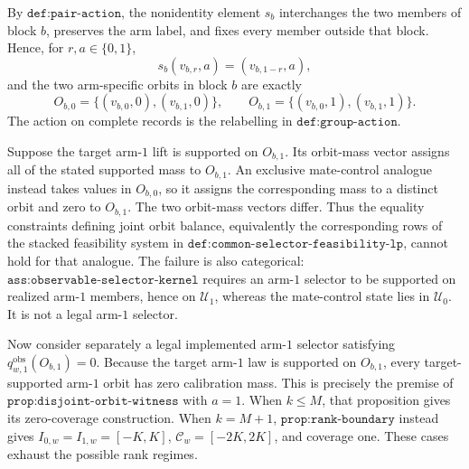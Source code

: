 By \(\texttt{def:pair-action}\), the nonidentity element \(s_b\) interchanges the two members of block \(b\), preserves the arm label, and fixes every member outside that block. Hence, for \(r,a\in\{0,1\}\),
\[s_b(v_{b,r},a)=(v_{b,1-r},a),\]
and the two arm-specific orbits in block \(b\) are exactly
\[O_{b,0}=\{(v_{b,0},0),(v_{b,1},0)\},\qquad O_{b,1}=\{(v_{b,0},1),(v_{b,1},1)\}.\]
The action on complete records is the relabelling in \(\texttt{def:group-action}\).

Suppose the target arm-\(1\) lift is supported on \(O_{b,1}\). Its orbit-mass vector assigns all of the stated supported mass to \(O_{b,1}\). An exclusive mate-control analogue instead takes values in \(O_{b,0}\), so it assigns the corresponding mass to a distinct orbit and zero to \(O_{b,1}\). The two orbit-mass vectors differ. Thus the equality constraints defining joint orbit balance, equivalently the corresponding rows of the stacked feasibility system in \(\texttt{def:common-selector-feasibility-lp}\), cannot hold for that analogue. The failure is also categorical: \(\texttt{ass:observable-selector-kernel}\) requires an arm-\(1\) selector to be supported on realized arm-\(1\) members, hence on \(\mathcal U_1\), whereas the mate-control state lies in \(\mathcal U_0\). It is not a legal arm-\(1\) selector.

Now consider separately a legal implemented arm-\(1\) selector satisfying \(q^{\mathrm{obs}}_{w,1}(O_{b,1})=0\). Because the target arm-\(1\) law is supported on \(O_{b,1}\), every target-supported arm-\(1\) orbit has zero calibration mass. This is precisely the premise of \(\texttt{prop:disjoint-orbit-witness}\) with \(a=1\). When \(k\le M\), that proposition gives its zero-coverage construction. When \(k=M+1\), \(\texttt{prop:rank-boundary}\) instead gives \(I_{0,w}=I_{1,w}=[-K,K]\), \(\mathcal C_w=[-2K,2K]\), and coverage one. These cases exhaust the possible rank regimes.